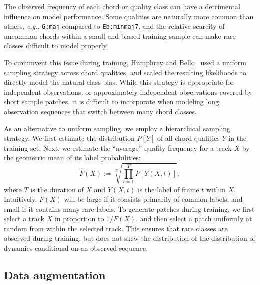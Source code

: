 \documentclass{article}
\def\eg{\emph{e.g.\/}}
\begin{document}
The observed frequency of each chord or quality class can have a detrimental influence on model performance.
Some qualities are naturally more common than others, \eg, \texttt{G:maj} compared to \texttt{Eb:minmaj7}, and the relative scarcity of uncommon chords within a small and biased training sample can make rare classes difficult to model properly.


To circumvent this issue during training, Humphrey and Bello~\cite{humphrey2015four} used a uniform sampling strategy across chord qualities, and scaled the resulting likelihoods to directly model the natural class bias.
While this strategy is appropriate for independent observations, or approximately independent observations covered by short sample patches, it is difficult to incorporate when modeling long observation sequences that switch between many chord classes.


%
As an alternative to uniform sampling, we employ a hierarchical sampling strategy.
We first estimate the distribution $P[Y]$ of all chord qualities $Y$ in the training set.
Next, we estimate the ``average'' quality frequency for a track $X$ by the geometric mean of its label probabilities:
\begin{equation}
    \hat{F}(X) := \sqrt[T]{\prod_{t=1}^{T} P[Y(X, t)]},
\end{equation}
where $T$ is the duration of $X$ and $Y(X, t)$ is the label of frame $t$ within $X$.
Intuitively, $F(X)$ will be large if it consists primarily of common labels, and small if it contains many rare labels.
To generate patches during training, we first select a track $X$ in proportion to $1/F(X)$, and then select a patch uniformly at random from within the selected track.
This ensures that rare classes are observed during training, but does not skew the distribution of the distribution of dynamics conditional on an observed sequence.

\subsection{Data augmentation}
\end{document}
